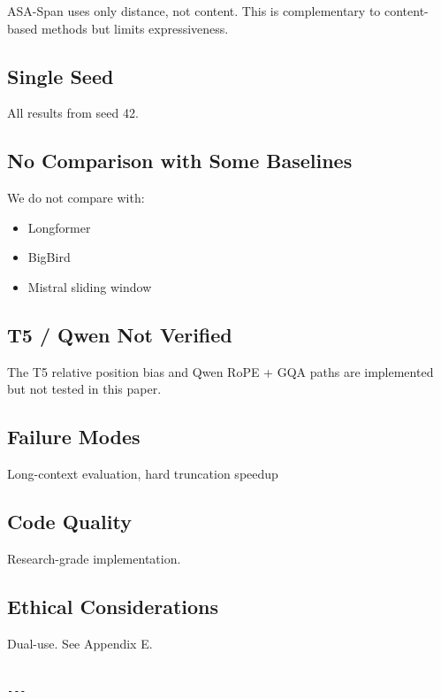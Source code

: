 ASA-Span uses only distance, not content. This is complementary to 
content-based methods but limits expressiveness.

\subsection{Single Seed}

All results from seed 42.

\subsection{No Comparison with Some Baselines}

We do not compare with:
\begin{itemize}
\item Longformer
\item BigBird
\item Mistral sliding window

\end{itemize}
\subsection{T5 / Qwen Not Verified}

The T5 relative position bias and Qwen RoPE + GQA paths are implemented but 
not tested in this paper.

\subsection{Failure Modes}

Long-context evaluation, hard truncation speedup

\subsection{Code Quality}

Research-grade implementation.

\subsection{Ethical Considerations}

Dual-use. See Appendix E.
\begin{lstlisting}

---
\end{lstlisting}